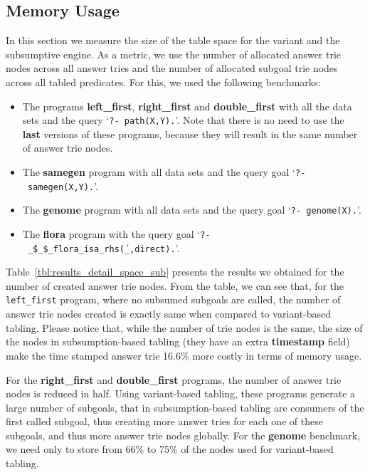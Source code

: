 


\subsection{Memory Usage}

In this section we measure the size of the table space for the variant and the subsumptive engine.
As a metric, we use the number of allocated answer trie nodes across all answer tries
and the number of allocated subgoal trie nodes across all tabled predicates.
For this, we used the following benchmarks:

\begin{itemize}
   \item The programs \textbf{left\_first}, \textbf{right\_first} and \textbf{double\_first} with
   all the data sets and the query `\texttt{?-~path(X,Y).}'. Note that there is no need to use
   the \textbf{last} versions of these programs, because they will result in the same number of answer trie nodes.
   
   \item The \textbf{samegen} program with all data sets and the query goal `\texttt{?-~samegen(X,Y).}'.
   
   \item The \textbf{genome} program with all data sets and the query goal `\texttt{?-~genome(X).}'.
   
   \item The \textbf{flora} program with the query goal `\texttt{?-~\'\_\$\_\$\_flora\_isa\_rhs\'(\_,direct).}'.
\end{itemize}

Table~\ref{tbl:results_detail_space_sub} presents the results we obtained for the number of created
answer trie nodes. From the table, we can see that,
for the \texttt{left\_first} program, where no subsumed subgoals are called, the number of answer trie nodes created is
exactly same when compared to variant-based tabling. Please notice that, while the number of trie nodes is
the same, the size of the nodes in subsumption-based tabling (they have an extra \textbf{timestamp} field) make
the time stamped answer trie 16.6\% more costly in terms of memory usage.

For the \textbf{right\_first} and \textbf{double\_first} programs, the number of answer trie nodes
is reduced in half. Using variant-based tabling, these programs generate a large number of subgoals,
that in subsumption-based tabling are consumers of the first called subgoal, thus creating more
answer tries for each one of these subgoals, and thus more answer trie nodes globally.
For the \textbf{genome} benchmark, we need only to store from 66\% to 75\% of the nodes used for
variant-based tabling.

